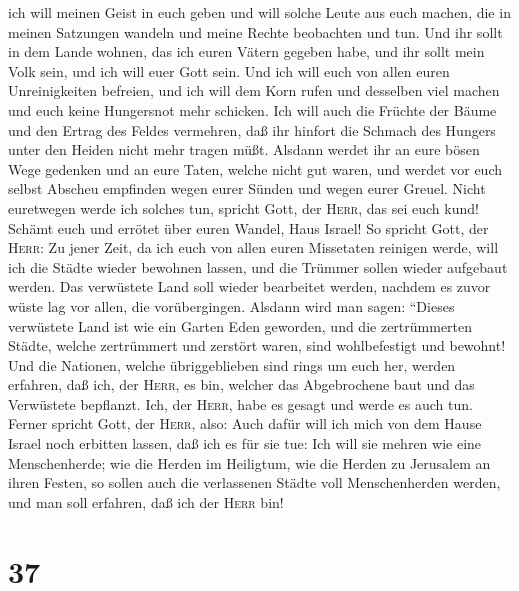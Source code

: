  ich will meinen Geist in euch geben und will solche
Leute aus euch machen, die in meinen Satzungen wandeln und meine Rechte
beobachten und tun.  Und ihr sollt in dem Lande wohnen,
das ich euren Vätern gegeben habe, und ihr sollt mein Volk sein, und ich
will euer Gott sein.  Und ich will euch von allen euren
Unreinigkeiten befreien, und ich will dem Korn rufen und desselben viel
machen und euch keine Hungersnot mehr schicken.  Ich will
auch die Früchte der Bäume und den Ertrag des Feldes vermehren, daß ihr
hinfort die Schmach des Hungers unter den Heiden nicht mehr tragen müßt.
 Alsdann werdet ihr an eure bösen Wege gedenken und an
eure Taten, welche nicht gut waren, und werdet vor euch selbst Abscheu
empfinden wegen eurer Sünden und wegen eurer Greuel. 
Nicht euretwegen werde ich solches tun, spricht Gott, der \textsc{Herr},
das sei euch kund! Schämt euch und errötet über euren Wandel, Haus
Israel!  So spricht Gott, der \textsc{Herr}: Zu jener
Zeit, da ich euch von allen euren Missetaten reinigen werde, will ich
die Städte wieder bewohnen lassen, und die Trümmer sollen wieder
aufgebaut werden.  Das verwüstete Land soll wieder
bearbeitet werden, nachdem es zuvor wüste lag vor allen, die
vorübergingen.  Alsdann wird man sagen: ``Dieses
verwüstete Land ist wie ein Garten Eden geworden, und die zertrümmerten
Städte, welche zertrümmert und zerstört waren, sind wohlbefestigt und
bewohnt!  Und die Nationen, welche übriggeblieben sind
rings um euch her, werden erfahren, daß ich, der \textsc{Herr}, es bin,
welcher das Abgebrochene baut und das Verwüstete bepflanzt. Ich, der
\textsc{Herr}, habe es gesagt und werde es auch tun. 
Ferner spricht Gott, der \textsc{Herr}, also: Auch dafür will ich mich
von dem Hause Israel noch erbitten lassen, daß ich es für sie tue: Ich
will sie mehren wie eine Menschenherde;  wie die Herden
im Heiligtum, wie die Herden zu Jerusalem an ihren Festen, so sollen
auch die verlassenen Städte voll Menschenherden werden, und man soll
erfahren, daß ich der \textsc{Herr} bin!

\hypertarget{section-36}{%
\section{37}\label{section-36}}

